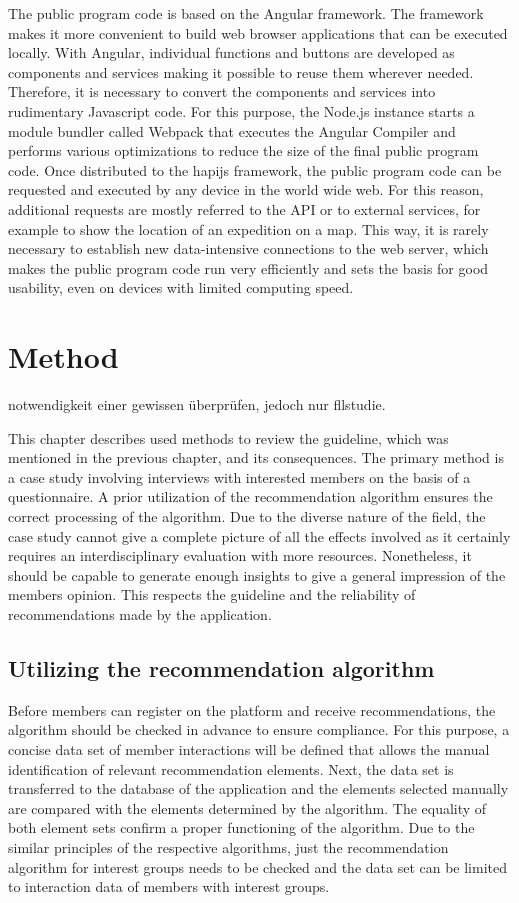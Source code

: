 \documentclass[12pt,numbers=noenddot,parskip,bibliography=totocnumbered,listof=totocnumbered,draft]{scrreprt}
\begin{document}
The public program code is based on the Angular \citep{angular} framework. The framework makes it more convenient to build web browser applications that can be executed locally. With Angular, individual functions and buttons are developed as components and services making it possible to reuse them wherever needed. Therefore, it is necessary to convert the components and services into rudimentary Javascript code. For this purpose, the Node.js instance starts a module bundler called Webpack \citep{webpack} that executes the Angular Compiler and performs various optimizations to reduce the size of the final public program code. Once distributed to the hapijs framework, the public program code can be requested and executed by any device in the world wide web. For this reason, additional requests are mostly referred to the API or to external services, for example to show the location of an expedition on a map. This way, it is rarely necessary to establish new data-intensive connections to the web server, which makes the public program code run very efficiently and sets the basis for good usability, even on devices with limited computing speed.

\chapter{Method}
notwendigkeit einer gewissen überprüfen, jedoch nur fllstudie. 


This chapter describes used methods to review the guideline, which was mentioned in the previous chapter, and its consequences. The primary method is a case study involving interviews with interested members on the basis of a questionnaire. A prior utilization of the recommendation algorithm ensures the correct processing of the algorithm. Due to the diverse nature of the field, the case study cannot give a complete picture of all the effects involved as it certainly requires an interdisciplinary evaluation with more resources. Nonetheless, it should be capable to generate enough insights to give a general impression of the members opinion. This respects the guideline and the reliability of recommendations made by the application.

\section{Utilizing the recommendation algorithm}
Before members can register on the platform and receive recommendations, the algorithm should be checked in advance to ensure compliance. For this purpose, a concise data set of member interactions will be defined that allows the manual identification of relevant recommendation elements. Next, the data set is transferred to the database of the application and the elements selected manually are compared with the elements determined by the algorithm. The equality of both element sets confirm a proper functioning of the algorithm. Due to the similar principles of the respective algorithms, just the recommendation algorithm for interest groups needs to be checked and the data set can be limited to interaction data of members with interest groups.
\end{document}
